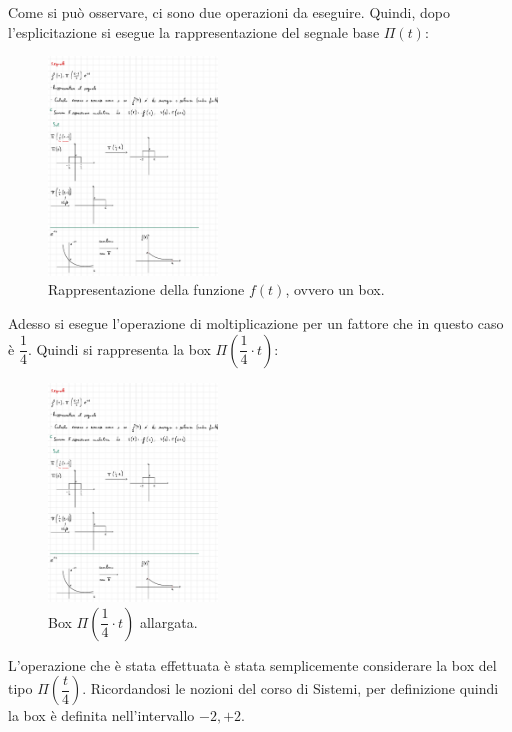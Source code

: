 \documentclass[a4paper]{article}
\begin{document}
	\noindent
	Come si può osservare, ci sono due operazioni da eseguire. Quindi, dopo l'esplicitazione si esegue la rappresentazione del segnale base $\Pi(t)$:
	
	\begin{figure}[!htp]
		\centering
		\includegraphics[width=0.4\textwidth]{img/ex_exam/Pi_func_1.pdf}
		\caption{Rappresentazione della funzione $f(t)$, ovvero un box.}
	\end{figure}

	\newpage
	Adesso si esegue l'operazione di moltiplicazione per un fattore che in questo caso è $\dfrac{1}{4}$. Quindi si rappresenta la box $\Pi\left(\dfrac{1}{4}\cdot t\right)$:
	
	\begin{figure}[!htp]
		\centering
		\includegraphics[width=0.4\textwidth]{img/ex_exam/Pi_func_1-Mod.pdf}
		\caption{Box $\Pi\left(\dfrac{1}{4}\cdot t\right)$ allargata.}
	\end{figure}

	\noindent
	L'operazione che è stata effettuata è stata semplicemente considerare la box del tipo $\Pi\left(\dfrac{t}{4}\right)$. Ricordandosi le nozioni del corso di Sistemi, per definizione quindi la box è definita nell'intervallo $-2, +2$.
	
\end{document}
